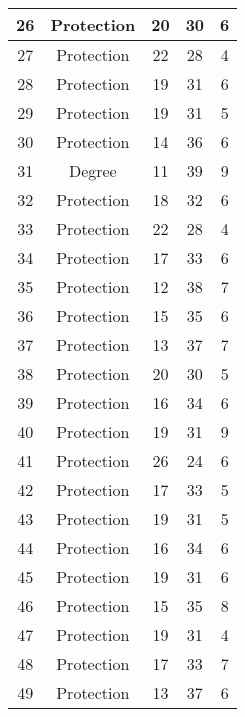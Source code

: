 \documentclass[results.tex]{subfiles}
\begin{document}
\begin{center}
\begin{tabular}{| c || c | c | c | c |}
    \hline
    26 & Protection & 20 & 30 & 6 \\ 
    \hline
    27 & Protection & 22 & 28 & 4 \\ 
    \hline
    28 & Protection & 19 & 31 & 6 \\ 
    \hline
    29 & Protection & 19 & 31 & 5 \\ 
    \hline
    30 & Protection & 14 & 36 & 6 \\ 
    \hline
    31 & Degree & 11 & 39 & 9 \\ 
    \hline
    32 & Protection & 18 & 32 & 6 \\ 
    \hline
    33 & Protection & 22 & 28 & 4 \\ 
    \hline
    34 & Protection & 17 & 33 & 6 \\ 
    \hline
    35 & Protection & 12 & 38 & 7 \\ 
    \hline
    36 & Protection & 15 & 35 & 6 \\ 
    \hline
    37 & Protection & 13 & 37 & 7 \\ 
    \hline
    38 & Protection & 20 & 30 & 5 \\ 
    \hline
    39 & Protection & 16 & 34 & 6 \\ 
    \hline
    40 & Protection & 19 & 31 & 9 \\ 
    \hline
    41 & Protection & 26 & 24 & 6 \\ 
    \hline
    42 & Protection & 17 & 33 & 5 \\ 
    \hline
    43 & Protection & 19 & 31 & 5 \\ 
    \hline
    44 & Protection & 16 & 34 & 6 \\ 
    \hline
    45 & Protection & 19 & 31 & 6 \\ 
    \hline
    46 & Protection & 15 & 35 & 8 \\ 
    \hline
    47 & Protection & 19 & 31 & 4 \\ 
    \hline
    48 & Protection & 17 & 33 & 7 \\ 
    \hline
    49 & Protection & 13 & 37 & 6 \\ 
    \hline   \end{tabular}
\end{center}
\end{document}
